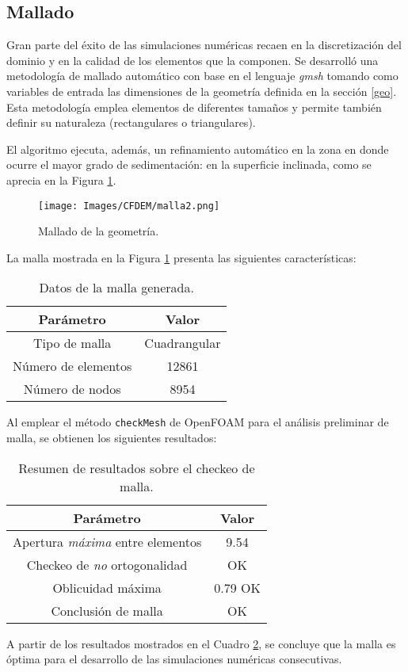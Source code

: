 \subsection{Mallado}

\noindent
\justify

Gran parte del \'exito de las simulaciones num\'ericas recaen en la discretizaci\'on del dominio y en la calidad de los elementos que la componen. Se desarroll\'o una metodolog\'ia de mallado autom\'atico con base en el lenguaje \textit{gmsh} tomando como variables de entrada las dimensiones de la geometr\'ia definida en la secci\'on \ref{geo}. Esta metodolog\'ia emplea elementos de diferentes tama\~nos y permite tambi\'en definir su naturaleza (rectangulares o triangulares).

\noindent
\justify

El algoritmo ejecuta, adem\'as, un refinamiento autom\'atico en la zona en donde ocurre el mayor grado de sedimentaci\'on: en la superficie inclinada, como se aprecia en la Figura \ref{malla:geo}.

\begin{figure}[h!]
	\centering
	\texttt{[image: Images/CFDEM/malla2.png]}
	\caption{Mallado de la geometr\'ia.}
	\label{malla:geo}
\end{figure}

\newpage

\noindent
\justify

La malla mostrada en la Figura \ref{malla:geo} presenta las siguientes caracter\'isticas:

\begin{table}[h!]
	\centering
	\begin{tabular}{|c|c|}
		\hline
		\textbf{Par\'ametro} & \textbf{Valor} \\ \hline
		Tipo de malla & Cuadrangular \\ \hline
		N\'umero de elementos & 12861 \\ \hline
		N\'umero de nodos & 8954 \\ \hline	
	\end{tabular}
	\caption{Datos de la malla generada.}
	\label{malla}
\end{table}

\noindent
\justify

Al emplear el m\'etodo \texttt{checkMesh} de OpenFOAM para el an\'alisis preliminar de malla, se obtienen los siguientes resultados:

\begin{table}[h!]
	\centering
	\begin{tabular}{|c|c|}
		\hline
		\textbf{Par\'ametro} & \textbf{Valor} \\ \hline
		Apertura \textit{m\'axima} entre elementos & 9.54 \\ \hline
		Checkeo de \textit{no} ortogonalidad & OK \\ \hline
		Oblicuidad m\'axima & 0.79 OK \\ \hline
		Conclusi\'on de malla & OK \\ \hline
	\end{tabular}
	\caption{Resumen de resultados sobre el checkeo de malla.}
	\label{check}
\end{table}

\noindent
\justify

A partir de los resultados mostrados en el Cuadro \ref{check}, se concluye que la malla es \'optima para el desarrollo de las simulaciones num\'ericas consecutivas.